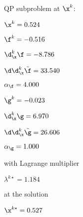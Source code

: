 QP subproblem at $\x^{k}$:

\bigskip
$\x^k=   0.524$


$\f^k =  -0.516$

$\d^k_{\x} \f =  -8.786$

$\d\d^k_{\x} \tilde \f =  33.540$

$\alpha_{\footnotesize\f} =   4.000$

\bigskip
$\g^k =  -0.023$

$\d^k_{\x}\g =   6.970$

$\d\d^k_{\x} \tilde \g =  26.606$

$\alpha_{\footnotesize\g} =   1.000$

\bigskip
with Lagrange multiplier

$\lambda^{k\star} =   1.184$

at the solution

$\x^{k\star} =   0.527$

